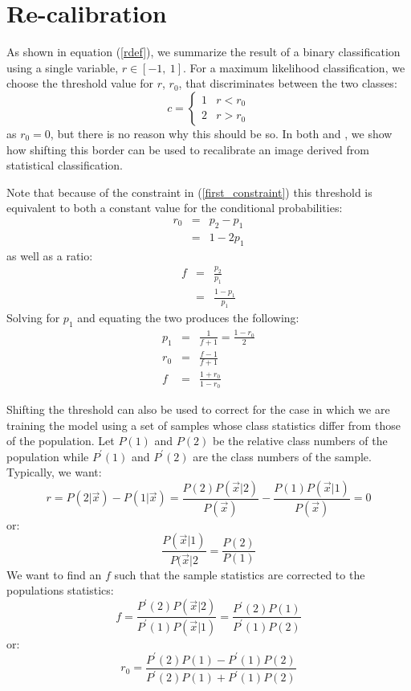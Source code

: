 \documentclass{article}
\begin{document}
\section{Re-calibration}

As shown in equation (\ref{rdef}), we summarize the result of a binary
classification using a single variable, $r \in [-1, ~1]$.  For a maximum
likelihood classification, we choose the threshold value for $r$, $r_0$,
that discriminates between the two classes:
\begin{equation}
c = \left \lbrace
\begin{array}{lr}
1 & r<r_0 \\
2 & r>r_0
\end{array}
\right .
\end{equation}
as $r_0 = 0$, but there is no reason why this should be so.  
In both \citet{Mills2009} and \citet{Mills2011}, we show how shifting this
border can be used to recalibrate an image derived from statistical
classification.

Note that because of the constraint in (\ref{first_constraint})
this threshold is equivalent to both a constant value for the conditional
probabilities:
\begin{eqnarray}
r_0 & = & p_2 - p_1 \\
& = & 1 - 2 p_1
\end{eqnarray}
as well as a ratio:
\begin{eqnarray}
f & = & \frac{p_2}{p_1} \\
  & = & \frac{1 - p_1}{p_1}
\end{eqnarray}
Solving for $p_1$ and equating the two produces the following:\
\begin{eqnarray}
p_1 & = & \frac{1}{f+1} = \frac{1 - r_0}{2} \\
r_0 & = & \frac{f-1}{f+1} \\
f & = & \frac{1+r_0}{1-r_0}
\end{eqnarray}

Shifting the threshold can also be used to correct for the case in which we
are training the model using a set of samples whose class statistics
differ from those of the population.
Let $P(1)$ and $P(2)$ be the relative class numbers of the population while
$P^\prime(1)$ and $P^\prime(2)$ are the class numbers of the sample.
Typically, we want:
\begin{equation}
r=P(2|\vec x)-P(1|\vec x)=
\frac{P(2)P(\vec x|2)}{P(\vec x)}-\frac{P(1)P(\vec x|1)}{P(\vec x)} = 0
\end{equation}
or:
\begin{equation}
\frac{P(\vec x|1)}{P(\vec x|2}=\frac{P(2)}{P(1)}
\end{equation}
We want to find an $f$ such that the sample statistics are corrected to
the populations statistics:
\begin{equation}
f = \frac{P^\prime(2)P(\vec x|2)}{P^\prime(1)P(\vec x|1)}
=\frac{P^\prime(2) P(1)}{P^\prime(1) P(2)}
\end{equation}
or:
\begin{equation}
r_0=\frac{P^\prime(2)P(1) - P^\prime(1) P(2)}
	{P^\prime(2)P(1) + P^\prime(1)P(2)}
\end{equation}
\end{document}
